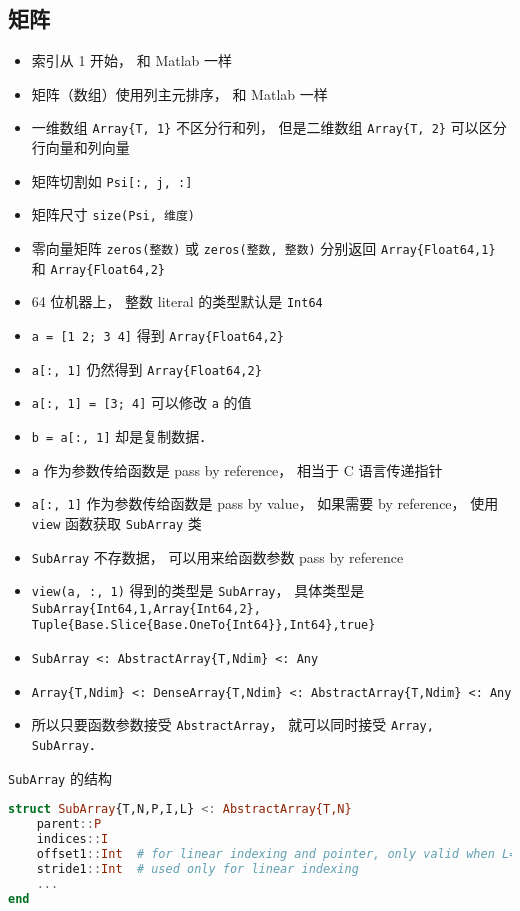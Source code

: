 \subsection{矩阵}
\begin{itemize}
\item 索引从 1 开始， 和 Matlab 一样
\item 矩阵（数组）使用列主元排序， 和 Matlab 一样
\item 一维数组 \verb|Array{T, 1}| 不区分行和列， 但是二维数组 \verb|Array{T, 2}| 可以区分行向量和列向量
\item 矩阵切割如 \verb|Psi[:, j, :]|
\item 矩阵尺寸 \verb|size(Psi, 维度)|
\item 零向量矩阵 \verb|zeros(整数)| 或 \verb|zeros(整数, 整数)| 分别返回 \verb|Array{Float64,1}| 和 \verb|Array{Float64,2}|
\item 64 位机器上， 整数 literal 的类型默认是 \verb|Int64|
\item \verb|a = [1 2; 3 4]| 得到 \verb|Array{Float64,2}|
\item \verb|a[:, 1]| 仍然得到 \verb|Array{Float64,2}|
\item \verb|a[:, 1] = [3; 4]| 可以修改 \verb|a| 的值
\item \verb|b = a[:, 1]| 却是复制数据．
\item \verb|a| 作为参数传给函数是 pass by reference， 相当于 C 语言传递指针
\item \verb|a[:, 1]| 作为参数传给函数是 pass by value， 如果需要 by reference， 使用 \verb|view| 函数获取 \verb|SubArray| 类
\item \verb|SubArray| 不存数据， 可以用来给函数参数 pass by reference
\item \verb|view(a, :, 1)| 得到的类型是 \verb|SubArray|， 具体类型是 \verb|SubArray{Int64,1,Array{Int64,2}, Tuple{Base.Slice{Base.OneTo{Int64}},Int64},true}|
\item \verb|SubArray <: AbstractArray{T,Ndim} <: Any|
\item \verb|Array{T,Ndim} <: DenseArray{T,Ndim} <: AbstractArray{T,Ndim} <: Any|
\item 所以只要函数参数接受 \verb|AbstractArray|， 就可以同时接受 \verb|Array, SubArray|．
\end{itemize}

\verb|SubArray| 的结构
\begin{lstlisting}[language=julia]
struct SubArray{T,N,P,I,L} <: AbstractArray{T,N}
    parent::P
    indices::I
    offset1::Int  # for linear indexing and pointer, only valid when L==true
    stride1::Int  # used only for linear indexing
    ...
end
\end{lstlisting}

